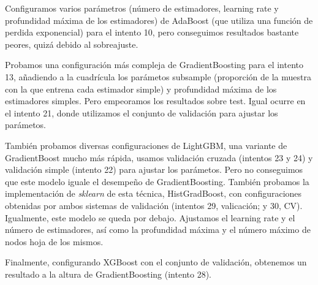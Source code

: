 \documentclass{article}
\begin{document}
Configuramos varios parámetros (número de estimadores, learning rate y
profundidad máxima de los estimadores) de AdaBoost (que utiliza una
función de perdida exponencial) para el intento 10, pero conseguimos
resultados bastante peores, quizá debido al sobreajuste.

Probamos una configuración más compleja de GradientBoosting para el
intento 13, añadiendo a la cuadrícula los parámetos subsample
(proporción de la muestra con la que entrena cada estimador simple) y
profundidad máxima de los estimadores simples. Pero empeoramos los
resultados sobre test. Igual ocurre en el intento 21, donde utilizamos
el conjunto de validación para ajustar los parámetos.

También probamos diversas configuraciones de LightGBM, una variante de
GradientBoost mucho más rápida, usamos validación cruzada (intentos 23
y 24) y validación simple (intento 22) para ajustar los
parámetos. Pero no conseguimos que este modelo iguale el desempeño de
GradientBoosting. También probamos la implementación de
\textit{sklearn} de esta técnica, HistGradBoost, con configuraciones
obtenidas por ambos sistemas de validación (intentos 29, valicación; y
30, CV). Igualmente, este modelo se queda por debajo. Ajustamos el
learning rate y el número de estimadores, así como la profundidad
máxima y el número máximo de nodos hoja de los mismos.

Finalmente, configurando XGBoost con el conjunto de validación,
obtenemos un resultado a la altura de GradientBoosting (intento 28).
\end{document}
